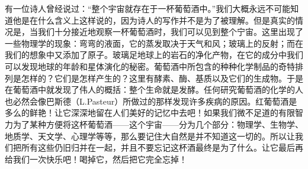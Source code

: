 有一位诗人曾经说过：“整个宇宙就存在于一杯葡萄酒中。”我们大概永远不可能知道他是在什么含义上这样说的，因为诗人的写作并不是为了被理解。但是真实的情况是，当我们十分接近地观察一杯葡萄酒时，我们可以见到整个宁宙。这里出现了一些物理学的现象：弯弯的液面，它的蒸发取决于天气和风；玻璃上的反射；而在我们的想象中又添加了原子。玻璃足地球上的岩石的净化产物，在它的成分中我们可以发现地球的年龄和星体演化的秘密。葡萄酒中所包含的种种化学制品的奇特排列是怎样的？它们是怎样产生的？这里有酵素、酶、基质以及它们的生成物。于是在葡萄酒中就发现了伟人的概括：整个生命就是发酵。任何研究葡萄酒的化学的人也必然会像巴斯德（L.Pasteur）所做过的那样发现许多疾病的原因。红葡萄酒是多么的鲜艳！让它深深地留在人们美好的记忆中去吧！如果我们微不足道的有限智力为了某种方便将这杯葡萄酒——这个宇宙——分为几个部分：物理学、生物学、地质学、天文学、心理学等等，那么要记住大自然是并不知道这一切的。所以让我们把所有这些仍旧归并在一起，并且不要忘记这杯酒最终是为了什么。让它最后再给我们一次快乐吧！喝掉它，然后把它完全忘掉！
